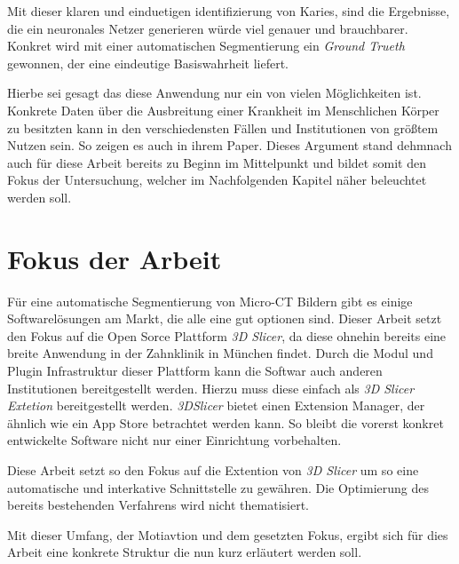 Mit dieser klaren und einduetigen identifizierung von Karies, sind die
Ergebnisse, die ein neuronales Netzer generieren würde viel genauer und brauchbarer.
Konkret wird mit einer automatischen Segmentierung ein \textit{Ground Trueth} gewonnen,
der eine eindeutige Basiswahrheit liefert.

Hierbe sei gesagt das diese Anwendung nur ein von vielen Möglichkeiten ist. Konkrete
Daten über die Ausbreitung einer Krankheit im Menschlichen Körper zu besitzten kann
in den verschiedensten Fällen und Institutionen von größtem Nutzen sein. So
zeigen es auch \citet{de20083d} in ihrem Paper. Dieses Argument stand dehmnach
auch für diese Arbeit bereits zu Beginn im Mittelpunkt und bildet somit den
Fokus der Untersuchung, welcher im Nachfolgenden Kapitel näher beleuchtet werden
soll.

\section{Fokus der Arbeit}
\label{sec:fokus_der-arbeit} Für eine automatische Segmentierung von Micro-CT Bildern
gibt es einige Softwarelösungen am Markt, die alle eine gut optionen sind. Dieser
Arbeit setzt den Fokus auf die Open Sorce Plattform \textit{3D Slicer}, da diese ohnehin
bereits eine breite Anwendung in der Zahnklinik in München findet. Durch die
Modul und Plugin Infrastruktur dieser Plattform kann die Softwar auch anderen Institutionen
bereitgestellt werden. Hierzu muss diese einfach als \textit{3D Slicer Extetion}
bereitgestellt werden. \textit{3DSlicer} bietet einen Extension Manager, der
ähnlich wie ein App Store betrachtet werden kann. So bleibt die vorerst konkret entwickelte
Software nicht nur einer Einrichtung vorbehalten.

Diese Arbeit setzt so den Fokus auf die Extention von \textit{3D Slicer} um so
eine automatische und interkative Schnittstelle zu gewähren. Die Optimierung des
bereits bestehenden Verfahrens wird nicht thematisiert.

Mit dieser Umfang, der Motiavtion und dem gesetzten Fokus, ergibt sich für dies Arbeit
eine konkrete Struktur die nun kurz erläutert werden soll.

